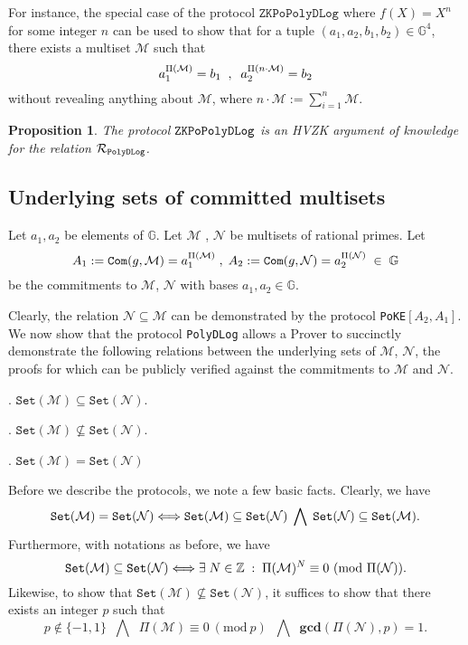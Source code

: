 \documentclass[11pt, lettersize, notitlepage, leqno, footskip=0.6cm]{article}
\newcommand{\bz}{\mathbb Z}
\newcommand{\ttt}{\texttt}
\newcommand{\bG}{\mathbb{G}}
\newcommand{\sett}{\ttt{Set}}
\newcommand{\LRA}{\Longleftrightarrow}
\newcommand{\mc}{\mathcal}
\newcommand{\mb}{\mathbb}
\newcommand{\mbf}{\mathbf}
\newcommand{\sub}{\subseteq}
\newcommand{\nsub}{\nsubseteq}
\newcommand{\mcM}{\mc{M}}
\newcommand{\vs}{\vspace{-0.15cm}}
\newcommand{\noin}{\noindent}
\newcommand{\Mod}[1]{\ (\mathrm{mod}\ #1)}
\newcommand{\GCD}{\mbf{gcd}}
\newtheorem{Prop}[Thm]{Proposition}
\numberwithin{equation}{section}
\begin{document}
For instance, the special case of the protocol $\ttt{ZKPoPolyDLog}$ where $f(X) = X^n$ for some integer $n$ can be used to show that for a tuple $(a_1, a_2, b_1, b_2)\in \mb{G}^4$, there exists a multiset $\mcM$ such that \vs $$ a_1^{\Pi(\mcM)} = b_1\;\;,\;\; a_2^{\Pi(n\cdot\mcM)} = b_2   \vs $$ without revealing anything about $\mcM$, where $n\cdot\mcM:= \sum_{i=1}^n \mc{M}.$


\begin{Prop} The protocol $\tt{ZKPoPolyDLog}$ is an HVZK argument of knowledge for the relation $\mc{R}_{\tt{PolyDLog}}$.\end{Prop}

\begin{prf} \end{prf}






\subsection{\fontsize{11}{11}\selectfont Underlying sets of committed multisets}

\noin \hypertarget{Sets}{Let $a_1,a_2$ be elements of $\mb{G}$. Let $\mc{M}$ , $\mc{N}$ be multisets of rational primes.} Let \vs $$A_1:= \ttt{Com}(g, \mc{M}) =  a_1^{\Pi(\mc{M})}\;,\; A_2:= \ttt{Com}(g, \mc{N}) = a_2^{\Pi(\mc{N})}\;\in\;\bG \vs $$ be the commitments to $\mc{M}$, $\mc{N}$ with bases $a_1, a_2\in \bG$.

Clearly, the relation $\mc{N}\sub \mc{M}$ can be demonstrated by the protocol \verb|PoKE|$[A_2, A_1]$. We now show that the protocol \verb|PolyDLog| allows a Prover to succinctly demonstrate the following relations between the underlying sets of $\mc{M}$, $\mc{N}$, the proofs for which can be publicly verified against the commitments to $\mc{M}$ and $\mc{N}$.\vspace{0.1cm}

\noin 1. $\sett(\mc{M})\sub \sett(\mc{N})$.

\noin 2. $\sett(\mc{M})\nsub \sett(\mc{N})$.

\noin 3. $\sett(\mc{M}) = \sett(\mc{N})$ \vspace{0.1cm}

\noin Before we describe the protocols, we note a few basic facts. Clearly, we have \vs $$\sett(\mc{M}) = \sett(\mc{N})\LRA \sett(\mc{M}) \sub \sett(\mc{N})\;\bigwedge\; \sett(\mc{N}) \sub \sett(\mc{M}). \vs $$ Furthermore, with notations as before, we have \vs $$\sett(\mc{M})\sub \sett(\mc{N})\LRA \exists\; N\in\bz\;:\;\Pi(\mc{M})^N\equiv 0\Mod{\Pi(\mc{N})}.\vs $$ Likewise, to show that $\sett(\mc{M})\nsub \sett(\mc{N})$, it suffices to show that there exists an integer $p$ such that \vs $$p\notin \{-1,1\}   \;\;\bigwedge\;\;\Pi(\mc{M})\equiv 0\Mod{p} \;\;\bigwedge\;\; \GCD(\Pi(\mc{N}),{p})=1.$$
\end{document}
